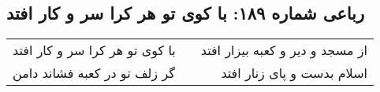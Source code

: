 \begin{center}
\section*{رباعی شماره ۱۸۹: با کوی تو هر کرا سر و کار افتد}
\label{sec:sh189}
\begin{longtable}{l p{0.5cm} r}
با کوی تو هر کرا سر و کار افتد
&&
از مسجد و دیر و کعبه بیزار افتد
\\
گر زلف تو در کعبه فشاند دامن
&&
اسلام بدست و پای زنار افتد
\\
\end{longtable}
\end{center}
